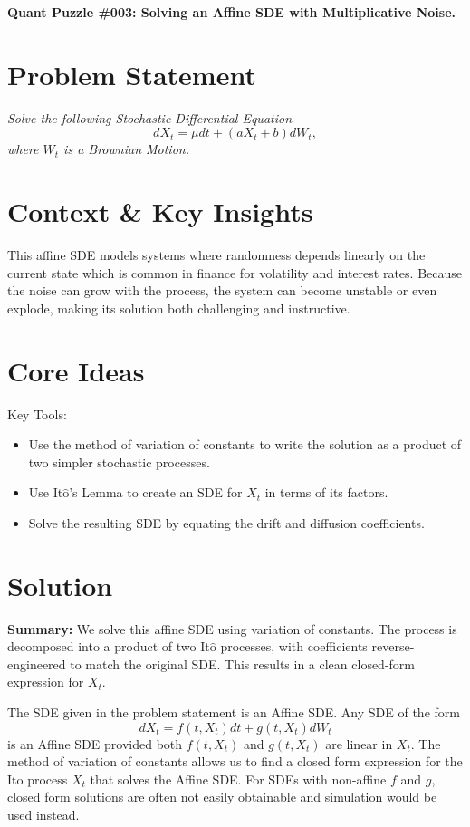 \documentclass[12pt]{article}
\newcommand{\Ito}{It$\hat{\text{o}}$ }
\newcommand{\Itos}{It$\hat{\text{o}}$'s }
\begin{document}
\begin{center}
    \Large \textbf{Quant Puzzle \#003: Solving an Affine SDE with Multiplicative Noise.}
\end{center}

\section*{Problem Statement}
\textit{Solve the following Stochastic Differential Equation}
\[
dX_t = \mu dt+ (aX_t + b)dW_t,
\]
\textit{where \(W_t\) is a Brownian Motion.}

\bigskip

\section*{Context \& Key Insights}
This affine SDE models systems where randomness depends linearly on the current state which is common in finance for volatility and interest rates. Because the noise can grow with the process, the system can become unstable or even explode, making its solution both challenging and instructive.

\section*{Core Ideas}
Key Tools:
\begin{itemize}
    \item Use the method of variation of constants to write the solution as a product of two simpler stochastic processes.
    \item Use \Itos Lemma to create an SDE for \(X_t\) in terms of its factors.
    \item Solve the resulting SDE by equating the drift and diffusion coefficients.
\end{itemize}

\bigskip

\section*{Solution}
\textbf{Summary:} We solve this affine SDE using variation of constants. The process is decomposed into a product of two \Ito processes, with coefficients reverse-engineered to match the original SDE. This results in a clean closed-form expression for \(X_t\).

\bigskip
\noindent
The SDE given in the problem statement is an Affine SDE. Any SDE of the form
\[
dX_t = f(t, X_t)dt + g(t, X_t) dW_t
\]
is an Affine SDE provided both \(f(t, X_t)\) and \(g(t, X_t)\) are linear in \(X_t\). The method of variation of constants allows us to find a closed form expression for the \Ito process \(X_t\) that solves the Affine SDE. For SDEs with non-affine $f$ and $g$, closed form solutions are often not easily obtainable and simulation would be used instead.
\end{document}
